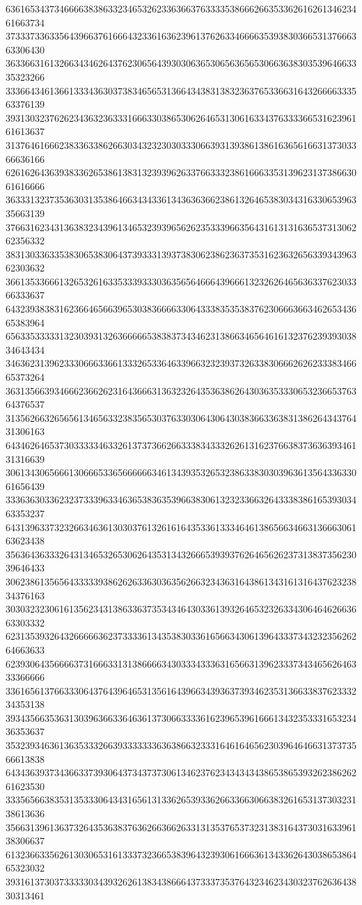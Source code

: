 63616534373466663838633234653262336366376333353866626635336261626134623461663734
37333733633564396637616664323361636239613762633466663539383036653137666363306430
36336631613266343462643762306564393030636530656365653066363830353964663335323266
33366434613661333436303738346565313664343831383236376533663164326666333563376139
39313032376262343632363331666330386530626465313061633437633336653162396161613637
31376461666238336338626630343232303033306639313938613861636561663137303366636166
62616264363938336265386138313239396263376633323861666335313962313738663061616666
36333132373536303135386466343433613436363662386132646538303431633065396335663139
37663162343136383234396134653239396562623533396635643161313163653731306262356332
38313033633538306538306437393331393738306238623637353162363265633934396362303632
36613533666132653261633533393330363565646664396661323262646563633762303366333637
64323938383162366465663965303836666330643338353538376230666366346265343665383964
65633533333132303931326366666538383734346231386634656461613237623939303834643434
34636231396233306663366133326533646339663232393732633830666262623338346665373264
36313566393466623662623164366631363232643536386264303635333065323665376364376537
31356266326565613465633238356530376330306430643038366336383138626434376431306163
64346264653730333334633261373736626633383433326261316237663837363639346131316639
30613430656661306665336566666634613439353265323863383030396361356433633061656439
33363630336232373339633463653836353966383061323233663264333838616539303463353237
64313963373232663463613030376132616164353361333464613865663466313666306163623438
35636436333264313465326530626435313432666539393762646562623731383735623039646433
30623861356564333339386262633630363562663234363164386134316131643762323834376163
30303232306161356234313863363735343464303361393264653232633430646462663663303332
62313539326432666663623733336134353830336165663430613964333734323235626264663633
62393064356666373166633131386666343033343336316566313962333734346562646333366666
33616561376633306437643964653135616439663439363739346235313663383762333234353138
39343566353631303963663364636137306633336162396539616661343235333165323436353637
35323934636136353332663933333336363866323331646164656230396464663137373566613838
64343639373436633739306437343737306134623762343434343865386539326238626261623530
33356566383531353330643431656131336265393362663366306638326165313730323138613636
35663139613637326435363837636266366263313135376537323138316437303163396138306637
61323663356261303065316133373236653839643239306166636134336264303865386465323032
39316137303733333034393262613834386664373337353764323462343032376263643830313461
